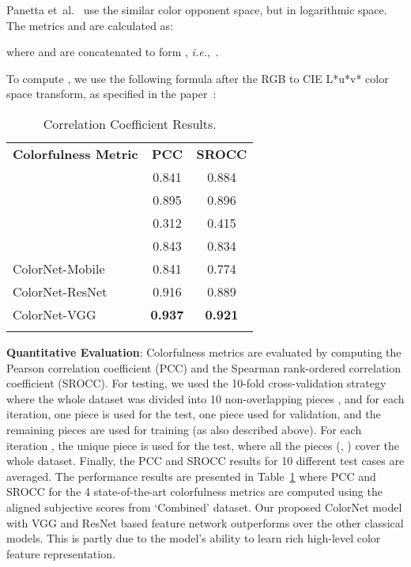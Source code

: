 \documentclass{article}
\newcommand{\smalllskip}[0]{\vspace{1pt}}
\newcommand{\ie}[0]{\textit{i.e.},~}
\begin{document}
Panetta et~al.~\cite{panetta2013no} use the similar color opponent space, but in logarithmic space. The metrics  and  are calculated as:

where  and  are concatenated to form , \ie . 

To compute , we use the following formula after the RGB to CIE L*u*v* color space transform, as specified in the paper~\cite{yendrikhovskij1998optimizing}: 




\begin{table}[bp]
    \vspace{-10pt}
    \centering
    \caption{Correlation Coefficient Results.} \vspace{5pt}
    \begin{tabular}{l|cc} \hline \hline \noalign{\smalllskip}
        \textbf{Colorfulness Metric} 
           & \textbf{PCC} & \textbf{SROCC} \\ \noalign{\smalllskip} \hline \noalign{\smalllskip}
        ~\cite{hasler2003measuring} 
           & 0.841 & 0.884 \\
        ~\cite{panetta2013no} 
           & 0.895 & 0.896 \\
        ~\cite{panetta2013no} 
           & 0.312 & 0.415 \\
        ~\cite{yendrikhovskij1998optimizing}
           & 0.843 & 0.834 \\ \noalign{\smalllskip} \hline \noalign{\smalllskip}
        ColorNet-Mobile
           & 0.841 & 0.774 \\
        ColorNet-ResNet
           & 0.916 & 0.889 \\
        ColorNet-VGG
           & \textbf{0.937} & \textbf{0.921} \\\noalign{\smalllskip} \hline \hline
    \end{tabular}
    \label{tab:corr}
\end{table}





\textbf{Quantitative Evaluation}: 
Colorfulness metrics are evaluated by computing the Pearson correlation coefficient (PCC) and the Spearman rank-ordered correlation coefficient (SROCC). For testing, we used the 10-fold cross-validation strategy where the whole dataset was divided into 10 non-overlapping pieces , and for each iteration, one piece is used for the test, one piece used for validation, and the remaining pieces are used for training (as also described above). For each iteration , the unique piece  is used for the test, where all the pieces (, ) cover the whole dataset. Finally, the PCC and SROCC results for 10 different test cases are averaged. The performance results are presented in Table~\ref{tab:corr} where PCC and SROCC for the 4 state-of-the-art colorfulness metrics are computed using the aligned subjective scores from `Combined' dataset. Our proposed ColorNet model with VGG and ResNet based feature network outperforms over the other classical models. This is partly due to the model's ability to learn rich high-level color feature representation. 
\end{document}
